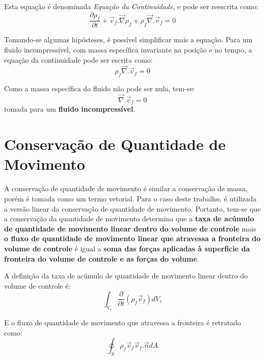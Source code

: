 Esta equação é denominada \textit{Equação da Continuidade}, e pode ser reescrita como:
\begin{equation}
    \dfrac{\partial \rho_f}{\partial t} + \vec{v}_f.\vec{\nabla} \rho_f + \rho_f \vec{\nabla}.\vec{v}_f = 0
    \label{continuity}
\end{equation}

Tomando-se algumas hipósteses, é possível simplificar mais a equação.
Para um fluido incompressível, com massa específica invariante na posição e no tempo, a equação da continuidade pode ser escrita como:
\begin{equation}
    \rho_f \vec{\nabla}.\vec{v}_f = 0
    \label{continuity_mid}
\end{equation}

Como a massa específica do fluido não pode ser nula, tem-se:
\begin{equation}
    \vec{\nabla}.\vec{v}_f = 0
    \label{continuity_final}
\end{equation}
tomada para um \textbf{fluido incompressível}.


\section{\textbf{Conservação de Quantidade de Movimento}}
\label{sec_cons_qmov}
A conservação de quantidade de movimento é similar a conservação de massa, porém é tomada como um termo vetorial.
Para o caso deste trabalho, é utilizada a versão linear da conservação de quantidade de movimento.
Portanto, tem-se que a conservação da quantidade de movimento determina que a \textbf{taxa de acúmulo de quantidade de movimento linear dentro do volume de controle} mais \textbf{o fluxo de quantidade de movimento linear que atravessa a fronteira do volume de controle} é igual a \textbf{soma das forças aplicadas à superficie da fronteira do volume de controle e as forças do volume}.

A definição da taxa de acúmulo de quantidade de movimento linear dentro do volume de controle é:
\begin{equation}
    \int_{V_c}\dfrac{\partial}{\partial t} (\rho_f \vec{v}_f) d V_c
    \label{acumulo_qmov}
\end{equation}

E o fluxo de quantidade de movimento que atravessa a fronteira é retratado como:
\begin{equation}
    \oint_{S}\rho_f \vec{v}_f \vec{v}_f.\vec{n} dA
    \label{fluxo_qmov}
\end{equation}

